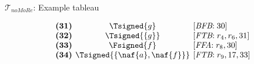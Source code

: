 \begin{frame}{$\mathcal{T}_{\textit{noMoRe}}$: Example tableau}
\begin{center}
\begin{minipage}[t]{16cm}
\begin{minipage}[t]{6cm}
\begin{minipage}[t]{2cm}
\[\begin{array}{l@{~~}c@{~~}l}
\textbf{(31)}                                      &
  \Tsigned{g}                                      &
  [\textit{BFB}{:}\;\text{30}]                     \\
\textbf{(32)}                                      &
  \Tsigned{\{g\}}                                  &
  [\textit{FTB}{:}\;r_4, r_6, \text{31}]           \\
\textbf{(33)}                                      &
  \Fsigned{f}                                      &
  [\textit{FFA}{:}\;r_8, \text{30}]                \\
\textbf{(34)}                                      & \hspace{-0.1cm}
  \Tsigned{\{\naf{a},\naf{f}\}}      \hspace{-0.1cm} &
  [\textit{FTB}{:}\;r_9, \text{17}, \text{33}]
\end{array}
\]
\end{minipage}
\end{minipage}
\end{minipage}
\end{center}
\end{frame}
